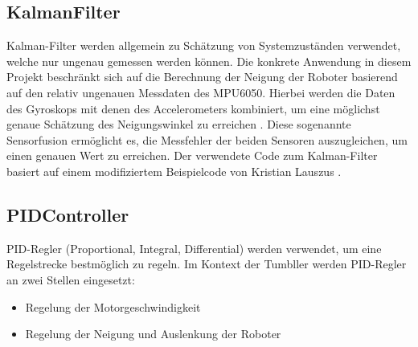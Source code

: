 \subsection{KalmanFilter}
\label{subsubsec:kalman}
Kalman-Filter werden allgemein zu Schätzung von Systemzuständen verwendet,
welche nur ungenau gemessen werden können.
%
Die konkrete Anwendung in diesem Projekt beschränkt sich auf die Berechnung
der Neigung der Roboter basierend auf den relativ ungenauen Messdaten des MPU6050.
%
Hierbei werden die Daten des Gyroskops mit denen des Accelerometers kombiniert,
um eine möglichst genaue Schätzung des Neigungswinkel zu erreichen \cite{digikey-kalman}.
%
Diese sogenannte Sensorfusion ermöglicht es,
die Messfehler der beiden Sensoren auszugleichen,
um einen genauen Wert zu erreichen.
%
Der verwendete Code zum Kalman-Filter basiert auf einem modifiziertem Beispielcode von Kristian Lauszus \cite{lauszus}.

\subsection{PIDController}
PID-Regler (Proportional, Integral, Differential) werden verwendet,
um eine Regelstrecke bestmöglich zu regeln.
%
Im Kontext der Tumbller werden PID-Regler an zwei Stellen eingesetzt:
\begin{itemize}
    \item Regelung der Motorgeschwindigkeit
    \item Regelung der Neigung und Auslenkung der Roboter
\end{itemize}

